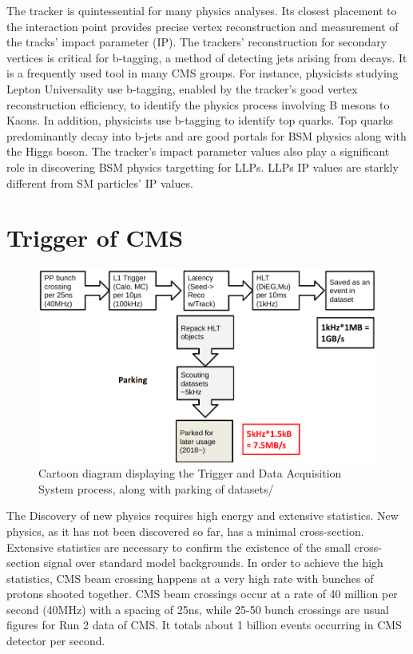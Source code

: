 The tracker is quintessential for many physics analyses.
Its closest placement to the interaction point provides precise vertex reconstruction and measurement of the tracks' impact parameter (IP).
The trackers' reconstruction for secondary vertices is critical for b-tagging, a method of detecting jets arising from \PQb decays.
It is a frequently used tool in many CMS groups.
For instance, physicists studying Lepton Universality use b-tagging, enabled by the tracker's good vertex reconstruction efficiency, to identify the physics process involving B mesons to Kaons.
In addition, physicists use b-tagging to identify top quarks.
Top quarks predominantly decay into b-jets and are good portals for BSM physics along with the Higgs boson.
The tracker's impact parameter values also play a significant role in discovering BSM physics targetting for LLPs.
LLPs IP values are starkly different from SM particles' IP values.


\section{Trigger of CMS}
\begin{figure}[h!]
	\caption{Cartoon diagram displaying the Trigger and Data Acquisition System process, along with parking of datasets/}
  \label{fig:trig}
  \centering
  \includegraphics[width=0.95\linewidth]{figs/Trig.png}
\end{figure}
The Discovery of new physics requires high energy and extensive statistics.
New physics, as it has not been discovered so far, has a minimal cross-section.
Extensive statistics are necessary to confirm the existence of the small cross-section signal over standard model backgrounds.
In order to achieve the high statistics, CMS beam crossing happens at a very high rate with bunches of protons shooted together.
CMS beam crossings occur at a rate of 40 million per second (40MHz) with a spacing of 25ns, while 25-50 bunch crossings are usual figures for Run 2 data of CMS.
It totals about 1 billion events occurring in CMS detector per second.

